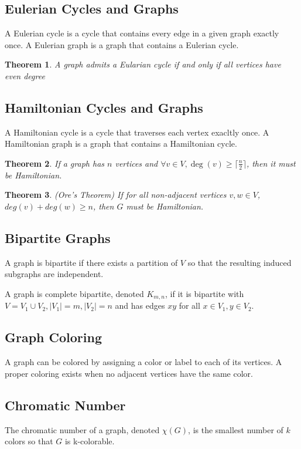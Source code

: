 \documentclass{article}
\newtheorem{theorem}{Theorem}[section]
\begin{document}
\subsection{Eulerian Cycles and Graphs}
A Eulerian cycle is a cycle that contains every edge in a given graph exactly once. A Eulerian graph is a graph that contains a Eulerian cycle.

\begin{theorem}
A graph admits a Eularian cycle if and only if all vertices have even degree
\end{theorem}

\subsection{Hamiltonian Cycles and Graphs}
A Hamiltonian cycle is a cycle that traverses each vertex exacltly once. A Hamiltonian graph is a graph that contains a Hamiltonian cycle.

\begin{theorem}
If a graph has $n$ vertices and $\forall v \in V, \deg(v) \geq  \lceil \frac{n}{2} \rceil$, then it must be Hamiltonian.
\end{theorem}


\begin{theorem}
(Ore's Theorem) If for all non-adjacent vertices $v,w \in V$, $deg(v) + deg(w) \geq n$, then $G$ must be Hamiltonian.
\end{theorem}

\subsection{Bipartite Graphs}
A graph is bipartite if there exists a partition of $V$ so that the resulting induced subgraphs are independent.

A graph is complete bipartite, denoted $K_{m,n}$, if it is bipartite with $V = V_1 \cup V_2, |V_1| = m, |V_2|= n$ and has edges $xy$ for all $x \in V_1, y \in V_2$.

\subsection{Graph Coloring}
A graph can be colored by assigning a color or label to each of its vertices. A proper coloring exists when no adjacent vertices have the same color.

\subsection{Chromatic Number}
The chromatic number of a graph, denoted $\chi (G)$, is the smallest number of $k$ colors so that $G$ is k-colorable.
\end{document}
